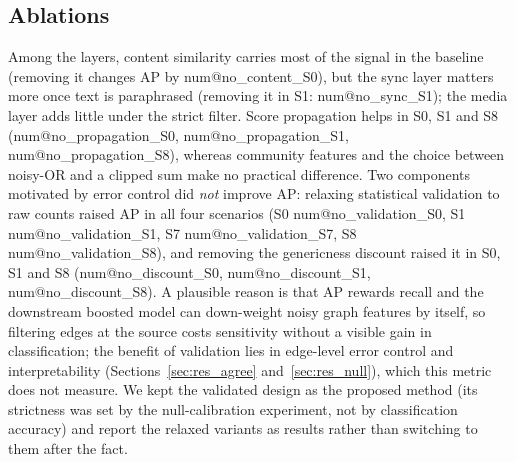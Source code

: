 \documentclass[pdflatex,sn-basic]{sn-jnl}
\makeatletter
\theoremstyle{thmstyleone}
\theoremstyle{thmstylethree}
\newcommand{\num}[1]{\csname num@#1\endcsname}
\makeatother
\begin{document}
\subsection{Ablations}\label{sec:res_abl}
Among the layers, content similarity carries most of the signal in the baseline (removing it changes AP by \num{no_content_S0}), but the sync layer matters more once text is paraphrased (removing it in S1: \num{no_sync_S1}); the media layer adds little under the strict filter. Score propagation helps in S0, S1 and S8 (\num{no_propagation_S0}, \num{no_propagation_S1}, \num{no_propagation_S8}), whereas community features and the choice between noisy-OR and a clipped sum make no practical difference. Two components motivated by error control did \emph{not} improve AP: relaxing statistical validation to raw counts raised AP in all four scenarios (S0 \num{no_validation_S0}, S1 \num{no_validation_S1}, S7 \num{no_validation_S7}, S8 \num{no_validation_S8}), and removing the genericness discount raised it in S0, S1 and S8 (\num{no_discount_S0}, \num{no_discount_S1}, \num{no_discount_S8}). A plausible reason is that AP rewards recall and the downstream boosted model can down-weight noisy graph features by itself, so filtering edges at the source costs sensitivity without a visible gain in classification; the benefit of validation lies in edge-level error control and interpretability (Sections~\ref{sec:res_agree} and~\ref{sec:res_null}), which this metric does not measure. We kept the validated design as the proposed method (its strictness was set by the null-calibration experiment, not by classification accuracy) and report the relaxed variants as results rather than switching to them after the fact.
\end{document}
